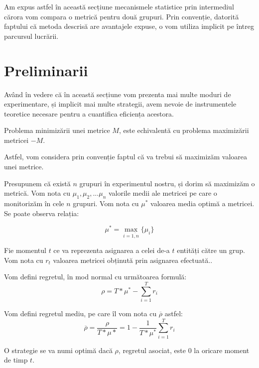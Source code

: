 Am expus astfel în această secțiune mecanismele statistice prin intermediul cărora vom compara o metrică pentru două grupuri. Prin convenție, datorită faptului că metoda descrisă are avantajele expuse, o vom utiliza implicit pe întreg parcursul lucrării.

\section{Preliminarii}

Având în vedere că în această secțiune vom prezenta mai multe moduri de experimentare, și implicit mai multe strategii, avem nevoie de instrumentele teoretice necesare pentru a cuantifica eficiența acestora.

\begin{remark}
	Problema minimizării unei metrice $M$, este echivalentă cu problema maximizării metricei $-M$.
\end{remark}

Astfel, vom considera prin convenție faptul că va trebui să maximizăm valoarea unei metrice.


Presupunem că există $n$ grupuri în experimentul nostru, și dorim să maximizăm o metrică. Vom nota cu $\mu_1, \mu_2, ... \mu_n$ valorile medii ale metricei pe care o monitorizăm în cele $n$ grupuri. Vom nota cu $\mu^*$ valoarea media optimă a metricei. Se poate observa relația:

\[
\mu^* = \max_{i = \overline{1, n}}\{\mu_i\}
\]

Fie momentul $t$ ce va reprezenta asignarea a celei de-a $t$ entități către un grup. Vom nota cu $r_t$ valoarea metricei obținută prin asignarea efectuată..

\begin{definition}
\label{regret}
Vom defini regretul, în mod normal cu următoarea formulă: 
\[
\rho = T * \mu^* - \sum_{i = 1}^{T}{r_i}
\]
\end{definition}

\begin{definition}
\label{regretaverage}
	Vom defini regretul mediu, pe care îl vom nota cu $\overline{\rho}$ astfel:
	\[
	\overline{\rho} = \frac{\rho}{T * \mu*} = 1 - \frac{1}{T * \mu^*}\sum_{i = 1}^{T}{r_i}
	\]
\end{definition}

\begin{definition}
	O strategie se va numi optimă dacă $\rho$, regretul asociat, este 0 la oricare moment de timp $t$.
\end{definition}

